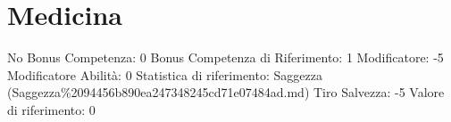 \section{Medicina}\label{medicina}

\begin{description}
\tightlist
\item[Tags: ABI]
No Bonus Competenza: 0 Bonus Competenza di Riferimento: 1 Modificatore:
-5 Modificatore Abilità: 0 Statistica di riferimento: Saggezza
(Saggezza\%2094456b890ea247348245cd71e07484ad.md) Tiro Salvezza: -5
Valore di riferimento: 0
\end{description}
